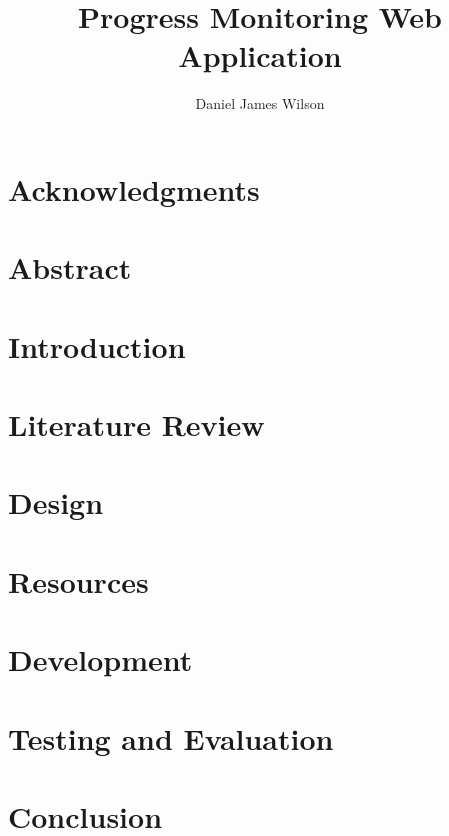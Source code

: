 \documentclass[titlepage,a4paper,11pt,oneside]{book} %
\author{Daniel James Wilson}
\title{Progress Monitoring Web Application}
\date{\parbox{\linewidth}{\centering%
  \today\endgraf\bigskip
  Supervisor:\\
  Moi Hoon Yap}}
\begin{document}
\frontmatter %
\maketitle

\chapter{Acknowledgments}


\chapter{Abstract}


\tableofcontents

\pagebreak
{}
\listoffigures
\pagebreak

\pagestyle{empty}
\printnomenclature[2cm]

\mainmatter %
\chapter{Introduction}
\label{sec:mainIntro}


\chapter{Literature Review}
\label{sec:litrev}


\chapter{Design}
\label{sec:design}


\chapter{Resources}
\label{sec:resources}


\chapter{Development}
\label{sec:dev}


\chapter{Testing and Evaluation}
\label{sec:test}


\chapter{Conclusion}
\label{sec:conc}


\pagebreak
\renewcommand{\bibname}{References}

\end{document}
